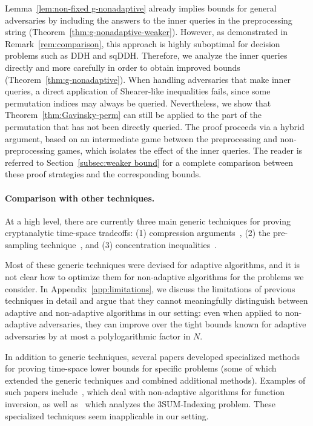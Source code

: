 \documentclass[11pt]{article}
\begin{document}
Lemma~\ref{lem:non-fixed g-nonadaptive} already implies bounds for general adversaries by including the answers to the inner queries in the preprocessing string (Theorem~\ref{thm:g-nonadaptive-weaker}). However, as demonstrated in Remark~\ref{rem:comparison}, this approach is highly suboptimal for decision problems such as DDH and sqDDH. Therefore, we analyze the inner queries directly and more carefully in order to obtain improved bounds (Theorem~\ref{thm:g-nonadaptive}). When handling adversaries that make inner queries, a direct application of Shearer-like inequalities fails, since some permutation indices may always be queried. Nevertheless, we show that Theorem~\ref{thm:Gavinsky-perm} can still be applied to the part of the permutation that has not been directly queried. The proof proceeds via a hybrid argument, based on an intermediate game between the preprocessing and non-preprocessing games, which isolates the effect of the inner queries. The reader is referred to Section~\ref{subsec:weaker bound} for a complete comparison between these proof strategies and the corresponding bounds.
\paragraph{Comparison with other techniques.} 
At a high level, there are currently three main generic techniques for proving cryptanalytic time-space tradeoffs:
(1) compression arguments~\cite{Corrigan-GibbsK18,FreitagGK22,GennaroT00,GolovnevGHPV20,Wee05}, (2)
the pre-sampling technique~\cite{BartusekMZ19,CorettiDG18,CorettiDGS18,DodisGK17,Unruh07}, and (3) concentration inequalities~\cite{AkshimaBGXY24,AkshimaCDW20,AkshimaGL24,ChawinHM20,ChungGLQ20,GuoLLZ21,ImpagliazzoK10}.  

Most of these generic techniques were devised for adaptive algorithms, and it is not clear how to optimize them for non-adaptive algorithms for the problems we consider. 
In Appendix~\ref{app:limitations}, we discuss the limitations of previous techniques in detail and argue that they cannot meaningfully distinguish between adaptive and non-adaptive algorithms in our setting: even when applied to non-adaptive adversaries, they can improve over the tight bounds known for adaptive adversaries by at most a polylogarithmic factor in $N$.

In addition to generic techniques, several papers developed specialized methods for proving time-space lower bounds for specific problems (some of which extended the generic techniques and combined additional methods). 
Examples of such papers include~\cite{ChawinHM20,GajulapalliGK24,GolovnevGPS23}, which deal with non-adaptive algorithms for function inversion, as well as~\cite{ChungL23} which analyzes the 3SUM-Indexing problem.
These specialized techniques seem inapplicable in our setting.
\end{document}
